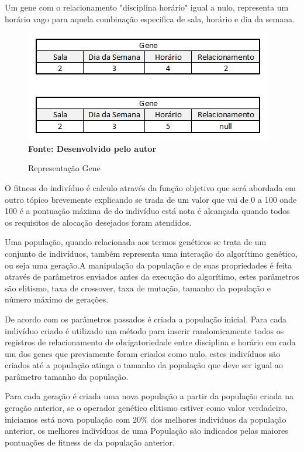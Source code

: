 \documentclass{abntpuc}
\begin{document}
Um gene com o relacionamento "disciplina horário" igual a nulo, representa um horário vago para aquela combinação especifica de sala, horário e dia da semana.\par

\begin{figure}[!htb]
\caption[Representação Gene]{Representação Gene}
\label{fig:figura5}
\centering
\includegraphics[scale=0.7]{imagens/representacaoGene.png}
\\ \textbf{\footnotesize Fonte: Desenvolvido pelo autor}
\end{figure}

O fitness do indivíduo é calculo através da função objetivo que será abordada em outro tópico brevemente explicando se trada de um valor que vai de 0 a 100 onde 100 é a pontuação máxima de do indivíduo está nota é alcançada quando todos os requisitos de alocação desejados foram atendidos.


Uma população, quando relacionada aos termos genéticos se trata de um conjunto de indivíduos, também representa uma interação do algorítimo genético, ou seja uma geração.A manipulação da população e de suas propriedades é feita através de parâmetros enviados antes da execução do algorítimo, estes parâmetros são elitismo, taxa de crossover, taxa de mutação, tamanho da população e número máximo de gerações.

De acordo com os parâmetros passados é criada a população inicial. Para cada indivíduo criado é utilizado um método para inserir randomicamente todos os registros de relacionamento de obrigatoriedade entre disciplina e horário em cada um dos genes que previamente foram criados como nulo, estes indivíduos são criados até a população atinga o tamanho da população que deve ser igual ao parâmetro tamanho da população.\par

Para cada geração é criada uma nova população a partir da população criada na geração anterior, se o operador genético elitismo estiver como valor verdadeiro, iniciamos está nova população com 20\% dos melhores indivíduos da população anterior, os melhores indivíduos de uma População são indicados pelas maiores pontuações de fitness de da população anterior.\par
\end{document}

